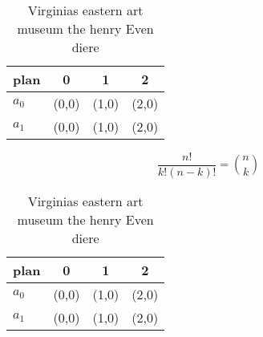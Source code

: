 \documentclass[a4paper]{article}
\begin{document}
\begin{table}
\begin{adjustbox}{width=0.6\columnwidth}
\begin{tabular}{|l|l|l|l|}
\hline
\textbf{plan} & \multicolumn{1}{c|}{\textbf{0}} & \multicolumn{1}{c|}{\textbf{1}} & \multicolumn{1}{c|}{\textbf{2}} \\ \hline
\textbf{$a_0$}  & (0,0) & (1,0) & (2,0) \\ \hline
\textbf{$a_1$}  & (0,0) & (1,0) & (2,0) \\ \hline
\end{tabular}
\end{adjustbox}
\caption{Virginias eastern art museum the henry Even diere
}
\end{table}

\[ \frac{n!}{k!(n-k)!} = \binom{n}{k} \]

\begin{table}
\begin{adjustbox}{width=0.6\columnwidth}
\begin{tabular}{|l|l|l|l|}
\hline
\textbf{plan} & \multicolumn{1}{c|}{\textbf{0}} & \multicolumn{1}{c|}{\textbf{1}} & \multicolumn{1}{c|}{\textbf{2}} \\ \hline
\textbf{$a_0$}  & (0,0) & (1,0) & (2,0) \\ \hline
\textbf{$a_1$}  & (0,0) & (1,0) & (2,0) \\ \hline
\end{tabular}
\end{adjustbox}
\caption{Virginias eastern art museum the henry Even diere
}
\end{table}
\end{document}

